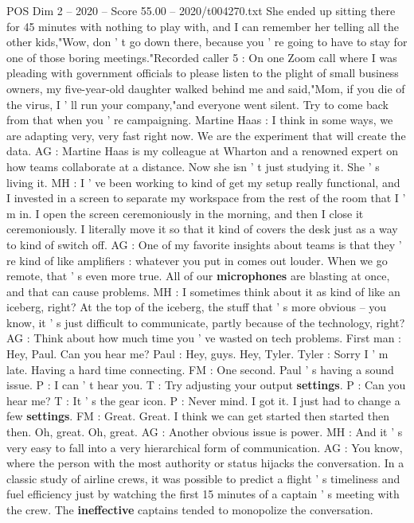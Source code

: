\begin{textsample}{POS Dim 2 – 2020 – Score 55.00 – 2020/t004270.txt}
She ended up sitting there for 45 minutes with nothing to play with, and I can remember her telling all the other kids,"Wow, don ' t go down there, because you ' re going to have to stay for one of those boring meetings."Recorded caller 5 : On one Zoom call where I was pleading with government officials to please listen to the plight of small business owners, my five-year-old daughter walked behind me and said,"Mom, if you die of the virus, I ' ll run your company,"and everyone went silent.
Try to come back from that when you ' re campaigning.
Martine Haas : I think in some ways, we are adapting very, very fast right now.
We are the experiment that will create the data.
AG : Martine Haas is my colleague at Wharton and a renowned expert on how teams collaborate at a distance.
Now she isn ' t just studying it.
She ' s living it.
MH : I ' ve been working to kind of get my setup really functional, and I invested in a screen to separate my workspace from the rest of the room that I ' m in.
I open the screen ceremoniously in the morning, and then I close it ceremoniously.
I literally move it so that it kind of covers the desk just as a way to kind of switch off.
AG : One of my favorite insights about teams is that they ' re kind of like amplifiers : whatever you put in comes out louder.
When we go remote, that ' s even more true.
All of our \textbf{microphones} are blasting at once, and that can cause problems.
MH : I sometimes think about it as kind of like an iceberg, right?
At the top of the iceberg, the stuff that ' s more obvious -- you know, it ' s just difficult to communicate, partly because of the technology, right?
AG : Think about how much time you ' ve wasted on tech problems.
First man : Hey, Paul.
Can you hear me?
Paul : Hey, guys.
Hey, Tyler.
Tyler : Sorry I ' m late.
Having a hard time connecting.
FM : One second.
Paul ' s having a sound issue.
P : I can ' t hear you.
T : Try adjusting your output \textbf{settings}.
P : Can you hear me?
T : It ' s the gear icon.
P : Never mind.
I got it.
I just had to change a few \textbf{settings}.
FM : Great.
Great.
I think we can get started then started then then.
Oh, great.
Oh, great.
AG : Another obvious issue is power.
MH : And it ' s very easy to fall into a very hierarchical form of communication.
AG : You know, where the person with the most authority or status hijacks the conversation.
In a classic study of airline crews, it was possible to predict a flight ' s timeliness and fuel efficiency just by watching the first 15 minutes of a captain ' s meeting with the crew.
The \textbf{ineffective} captains tended to monopolize the conversation.

\end{textsample}
